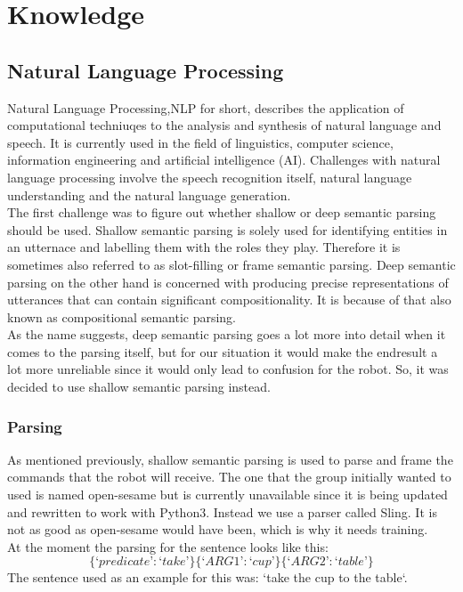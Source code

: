 \documentclass[main.tex]{subfiles}
\begin{document}
	
	\chapter{Knowledge}
		\section{Natural Language Processing}
		Natural Language Processing,NLP for short, describes the application of computational techniuqes to the analysis and synthesis of natural language and speech. It is currently used in the field of linguistics, computer science, information engineering and artificial intelligence (AI). Challenges with natural language processing involve the speech recognition itself, natural language understanding and the natural language generation.\\
		The first challenge was to figure out whether shallow or deep semantic parsing should be used. Shallow semantic parsing is solely used for identifying entities in an utternace and labelling them with the roles they play. Therefore it is sometimes also referred to as slot-filling or frame semantic parsing. Deep semantic parsing on the other hand is concerned with producing precise representations of utterances that can contain significant compositionality. It is because of that also known as compositional semantic parsing.\\
		As the name suggests, deep semantic parsing goes a lot more into detail when it comes to the parsing itself, but for our situation it would make the endresult a lot more unreliable since it would only lead to confusion for the robot. So, it was decided to use shallow semantic parsing instead.
		\subsection{Parsing}
		As mentioned previously, shallow semantic parsing is used to parse and frame the commands that the robot will receive. The one that the group initially wanted to used is named open-sesame but is currently unavailable since it is being updated and rewritten to work with Python3. Instead we use a parser called Sling. It is not as good as open-sesame would have been, which is why it needs training.\\
		At the moment the parsing for the sentence looks like this:
		\begin{equation}
		\{‘predicate’: ‘take’\} \{‘ARG1’: ‘cup’\} \{‘ARG2’: ‘table’\}
		\end{equation}		
		The sentence used as an example for this was: ‘take the cup to the table‘.
\end{document}
